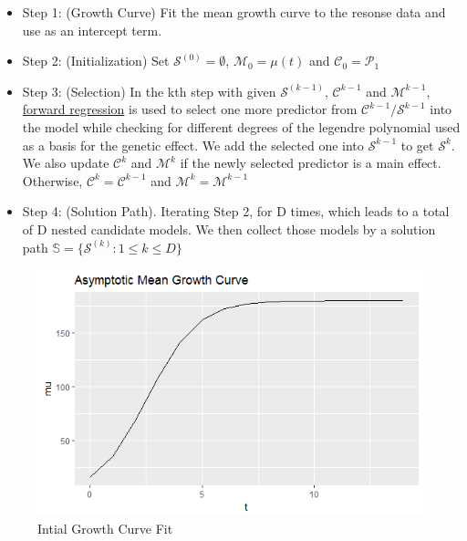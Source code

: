 \documentclass[11pt,]{book}
\providecommand{\tightlist}{%
  \setlength{\itemsep}{0pt}\setlength{\parskip}{0pt}}
\theoremstyle{definition}
\theoremstyle{definition}
\theoremstyle{remark}
\begin{document}
\begin{itemize}
\tightlist
\item
  Step 1: (Growth Curve) Fit the mean growth curve to the resonse data
  and use as an intercept term.\\
\item
  Step 2: (Initialization) Set \(\mathcal{S}^{(0)} = \emptyset\),
  \(\mathcal{M}_0 = \mu(t)\) and \(\mathcal{C}_0 = \mathcal{P_1}\)
\item
  Step 3: (Selection) In the kth step with given
  \(\mathcal{S}^{(k-1)}\), \(\mathcal{C}^{k−1}\) and
  \(\mathcal{M}^{k−1}\), \protect\hyperlink{ux2f7}{forward regression}
  is used to select one more predictor from
  \(\mathcal{C}^{k−1}/ \mathcal{S}^{k−1}\) into the model while checking
  for different degrees of the legendre polynomial used as a basis for
  the genetic effect. We add the selected one into \(\mathcal{S}^{k−1}\)
  to get \(\mathcal{S}^k\). We also update \(\mathcal{C}^k\) and
  \(\mathcal{M}^k\) if the newly selected predictor is a main effect.
  Otherwise, \(\mathcal{C}^k = \mathcal{C}^{k−1}\) and
  \(\mathcal{M}^k = \mathcal{M}^{k−1}\)
\item
  Step 4: (Solution Path). Iterating Step 2, for D times, which leads to
  a total of D nested candidate models. We then collect those models by
  a solution path \(\mathbb{S}=\{\mathcal{S}^{(k)}: 1 \le k \le D\}\)
\end{itemize}

\begin{figure}

{\centering \includegraphics[width=0.8\linewidth]{images/GrowthCurveExample} 

}

\caption{Intial Growth Curve Fit}\label{fig:growth-example}
\end{figure}
\end{document}

